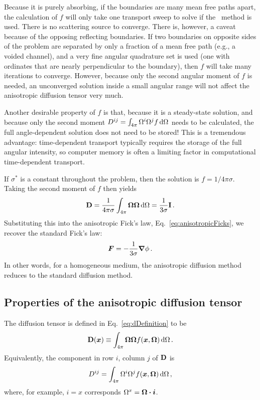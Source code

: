 Because it is purely absorbing, if the boundaries are many mean free paths
apart, the calculation of $f$ will only take one transport sweep to solve if
the \SN\ method is used. There is no scattering source to converge.
There is, however, a caveat because of the opposing reflecting boundaries. If
two boundaries on opposite sides of the problem are separated by only a
fraction of a mean free path (e.g., a voided channel), and a very fine angular
quadrature set is used (one with ordinates that are nearly perpendicular to the
boundary), then $f$ will take many iterations to converge.
However, because only the second angular moment of $f$ is needed, an
unconverged solution inside a small angular range will not affect the
anisotropic diffusion tensor very much.

Another desirable property of $f$ is that, because it is a steady-state
solution, and because only the second moment
$D^{ij}=\int_{4\pi} \Omega^i \Omega^j f \mathop{}\!\mathrm{d}\Omega$ needs to be calculated, the
full angle-dependent solution does not need to be stored! This is a tremendous
advantage: time-dependent transport typically requires the storage of the full
angular intensity, so computer memory is often a limiting factor in
computational time-dependent transport.

If $\sigma^*$ is a constant throughout the problem, then the solution is
$f=1/4\pi\sigma$. Taking the second moment of $f$ then yields
\begin{equation*}
  \mathbf{D} = \frac{1}{4\pi\sigma} \int_{4\pi} \bm{\Omega} \bm{\Omega} \mathop{}\!\mathrm{d} \Omega
  = \frac{1}{3\sigma} \mathbf{I}\,.
\end{equation*}
Substituting this into the anisotropic Fick's law,
Eq.~\eqref{eq:anisotropicFicks}, we recover the standard Fick's law:
\begin{equation*}
  \bm{F} = - \frac{1}{3\sigma} \bm{\nabla} \phi\,.
\end{equation*}
In other words, for a homogeneous medium, the anisotropic diffusion method
reduces to the standard diffusion method.

\subsection{Properties of the anisotropic diffusion tensor}
The diffusion tensor is defined in Eq.~\eqref{eq:dDefinition} to be
\begin{equation*}
  \mathbf{D}(\bm{x}) \equiv \int_{4\pi} \bm{\Omega} \bm{\Omega}
  f(\bm{x}, \bm{\Omega}) \mathop{}\!\mathrm{d}\Omega \,.
\end{equation*}
Equivalently, the component in row $i$, column $j$ of $\mathbf{D}$ is
\begin{equation}\label{eq:dij}
  D^{ij} = \int_{4\pi} \Omega^i \Omega^j
  f(\bm{x}, \bm{\Omega}) \mathop{}\!\mathrm{d}\Omega \,,
\end{equation}
where, for example, $i=x$ corresponds $\Omega^x =
\bm{\Omega} \bm{\cdot} \bm{i}$.

